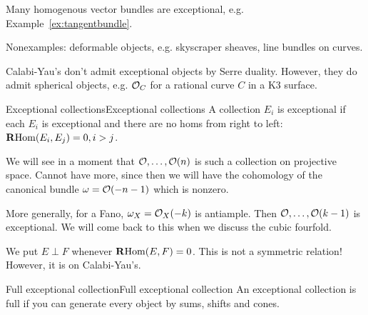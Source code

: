 Many homogenous vector bundles are exceptional, e.g.
Example~\ref{ex:tangentbundle}.

Nonexamples: deformable objects, e.g. skyscraper sheaves, line bundles on curves.

\begin{remark}{}{}
    Calabi-Yau's don't admit exceptional objects by Serre duality. However, they do admit spherical objects, e.g. $\mathcal{O}_C$ for a rational curve $C$ in a K3 surface.
\end{remark}

\begin{definition}{Exceptional collections}{Exceptional collections}
    A collection $E_i$ is exceptional if each $E_i$ is exceptional and there are no homs from right to left: $\operatorname{\mathbf{R} Hom}(E_i,E_j)=0, i>j$.
\end{definition}

We will see in a moment that $\mathcal{O},\dots,\mathcal{O}(n)$ is such a collection on projective space. Cannot have more, since then we will have the cohomology of the canonical bundle $\omega=\mathcal{O}(-n-1)$ which is nonzero.

More generally, for a Fano, $\omega_X=\mathcal{O}_X(-k)$ is antiample. Then $\mathcal{O},\dots,\mathcal{O}(k-1)$ is exceptional. We will come back to this when we discuss the cubic fourfold.


We put $E \perp F$ whenever $\operatorname{\mathbf{R} Hom}(E,F)=0$. This is not a symmetric relation! However, it is on Calabi-Yau's.

\begin{definition}{Full exceptional collection}{Full exceptional collection}
    An exceptional collection is full if you can generate every object by sums, shifts and cones.
\end{definition}

